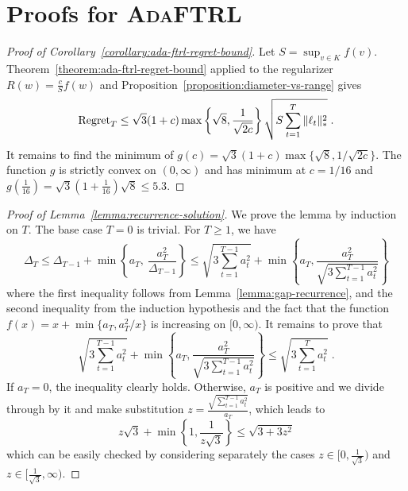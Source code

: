 \section{Proofs for \textsc{AdaFTRL}}
\label{section:ada-ftrl-proofs}

\begin{proof}[Proof of Corollary~\ref{corollary:ada-ftrl-regret-bound}]
Let $S = \sup_{v \in K} f(v)$. Theorem~\ref{theorem:ada-ftrl-regret-bound}
applied to the regularizer $R(w) = \frac{c}{S} f(w)$ and
Proposition~\ref{proposition:diameter-vs-range} gives
$$
\operatorname{Regret}_T \le \sqrt{3}(1 + c) \max\left\{\sqrt{8}, \frac{1}{\sqrt{2c}} \right\} \sqrt{S \sum_{t=1}^T \|\ell_t\|_*^2} \; .
$$
It remains to find the minimum of $g(c) = \sqrt{3}(1 + c) \max\{\sqrt{8},
1/\sqrt{2c}\}$.  The function $g$ is strictly convex on $(0, \infty)$ and has
minimum at $c=1/16$ and $g(\frac{1}{16}) = \sqrt{3}(1+\frac{1}{16})\sqrt{8} \le
5.3$.
\end{proof}

\begin{proof}[Proof of Lemma~\ref{lemma:recurrence-solution}]
We prove the lemma by induction on $T$.  The base case $T=0$ is trivial. For $T
\ge 1$, we have
$$
\Delta_T
\le \Delta_{T-1} + \min \left\{a_T, \ \frac{a_T^2}{\Delta_{T-1}} \right\}
\le \sqrt{3 \sum_{t=1}^{T-1} a_t^2} + \min \left\{ a_T, \frac{a_T^2}{\sqrt{3 \sum_{t=1}^{T-1} a_t^2}} \right\}
$$
where the first inequality follows from Lemma~\ref{lemma:gap-recurrence}, and
the second inequality from the induction hypothesis and the fact that the
function $f(x) = x + \min\{a_T, a_T^2/x\}$ is increasing on $[0,\infty)$.  It
remains to prove that
$$
\sqrt{3 \sum_{t=1}^{T-1} a_t^2} + \min \left\{ a_T, \frac{a_T^2}{\sqrt{3 \sum_{t=1}^{T-1} a_t^2}} \right\}
\le  \sqrt{3 \sum_{t=1}^T a_t^2} \; .
$$
If $a_T = 0$, the inequality clearly holds. Otherwise, $a_T$ is positive and we
divide through by it and make substitution $z=\frac{\sqrt{\sum_{t=1}^{T-1}
a_t^2}}{a_T}$, which leads to
$$
z\sqrt{3} + \min\left\{1,\frac{1}{z\sqrt{3}}\right\} \le \sqrt{3 + 3z^2}
$$
which can be easily checked by considering separately the cases $z \in
[0,\frac{1}{\sqrt{3}})$ and $z \in [\frac{1}{\sqrt{3}}, \infty)$.
\end{proof}

